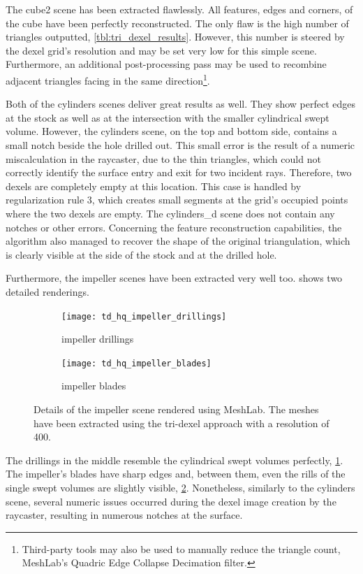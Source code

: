 %
The cube2 scene has been extracted flawlessly.
All features, \ie edges and corners, of the cube have been perfectly reconstructed.
The only flaw is the high number of triangles outputted, \cf \cref{tbl:tri_dexel_results}.
However, this number is steered by the dexel grid's resolution and may be set very low for this simple scene.
Furthermore, an additional post-processing pass may be used to recombine adjacent triangles facing in the same direction\footnote{Third-party tools may also be used to manually reduce the triangle count, \eg MeshLab's Quadric Edge Collapse Decimation filter.}.

Both of the cylinders scenes deliver great results as well.
They show perfect edges at the stock as well as at the intersection with the smaller cylindrical swept volume.
However, the cylinders scene, on the top and bottom side, contains a small notch beside the hole drilled out.
This small error is the result of a numeric miscalculation in the raycaster, due to the thin triangles, which could not correctly identify the surface entry and exit for two incident rays.
Therefore, two dexels are completely empty at this location.
This case is handled by regularization rule 3, which creates small segments at the grid's occupied points where the two dexels are empty.
The cylinders\_d scene does not contain any notches or other errors.
Concerning the feature reconstruction capabilities, the algorithm also managed to recover the shape of the original triangulation, which is clearly visible at the side of the stock and at the drilled hole.

Furthermore, the impeller scenes have been extracted very well too.
 shows two detailed renderings.
%
\begin{figure}
	\centering
	\begin{subfigure}[b]{0.49\textwidth}
		\centering
		\texttt{[image: td\_hq\_impeller\_drillings]}
		\caption{impeller drillings}
		\label{fig:td_hq_impeller_drillings}
	\end{subfigure}
	\begin{subfigure}[b]{0.49\textwidth}
		\centering
		\texttt{[image: td\_hq\_impeller\_blades]}
		\caption{impeller blades}
		\label{fig:td_hq_impeller_blades}
	\end{subfigure}
	\caption{
		Details of the impeller scene rendered using MeshLab.
		The meshes have been extracted using the tri-dexel approach with a resolution of 400.
	}
	\label{fig:td_hq_impeller_details}
\end{figure}
%
The drillings in the middle resemble the cylindrical swept volumes perfectly, \cf \cref{fig:td_hq_impeller_drillings}.
The impeller's blades have sharp edges and, between them, even the rills of the single swept volumes are slightly visible, \cf \cref{fig:td_hq_impeller_blades}.
Nonetheless, similarly to the cylinders scene, several numeric issues occurred during the dexel image creation by the raycaster, resulting in numerous notches at the surface.


